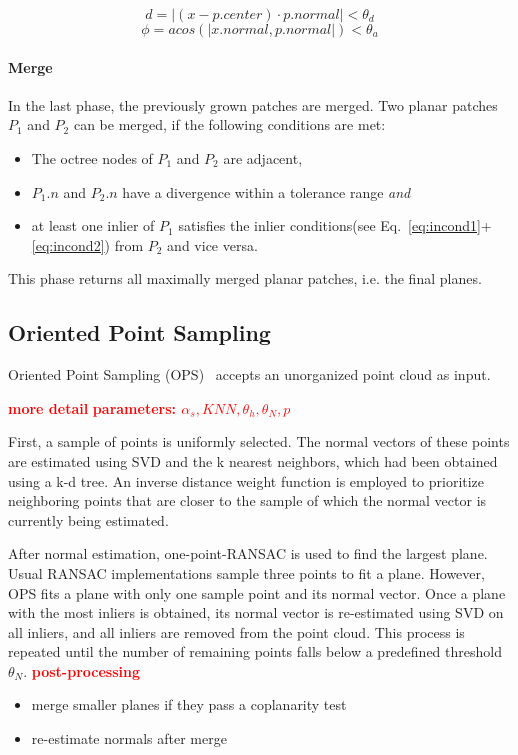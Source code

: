 \documentclass[main.tex]{subfiles}
\begin{document}
\begin{equation}
    \label{eq:incond1}
    d = |(x - p.center)\cdot p.normal| < \theta_d
\end{equation}
\begin{equation}
    \label{eq:incond2}
    \phi = acos(|x.normal, p.normal|) < \theta_a
\end{equation}

\paragraph*{Merge}
In the last phase, the previously grown patches are merged. Two planar patches $P_1$ and $P_2$ can be merged, if the following conditions are met:
\begin{itemize}
    \item The octree nodes of $P_1$ and $P_2$ are adjacent,
    \item $P_1.n$ and $P_2.n$ have a divergence within a tolerance range \textit{and}
    \item at least one inlier of $P_1$ satisfies the inlier conditions(see Eq.~\ref{eq:incond1}+\ref{eq:incond2}) from $P_2$ and vice versa.
\end{itemize}

This phase returns all maximally merged planar patches, i.e. the final planes.

\subsection{Oriented Point Sampling}
Oriented Point Sampling (OPS)~\cite{Sun_Mordohai_2019} accepts an unorganized point cloud as input.

\textbf{\textcolor{red}{more detail}}
\textbf{\textcolor{red}{parameters: $\alpha_s, KNN, \theta_h, \theta_N, p$}}

First, a sample of points is uniformly selected. The normal vectors of these points are estimated using SVD and the k nearest neighbors, which had been obtained using a k-d tree.
An inverse distance weight function is employed to prioritize neighboring points that are closer to the sample of which the normal vector is currently being estimated.


After normal estimation, one-point-RANSAC is used to find the largest plane. Usual RANSAC implementations sample three points to fit a plane. However, OPS fits a plane with only one sample point and its normal vector.
Once a plane with the most inliers is obtained, its normal vector is re-estimated using SVD on all inliers, and all inliers are removed from the point cloud.
This process is repeated until the number of remaining points falls below a predefined threshold $\theta_N$.
\textbf{\textcolor{red}{post-processing}}
\begin{itemize}
    \item merge smaller planes if they pass a coplanarity test
    \item re-estimate normals after merge
\end{itemize}
\end{document}
